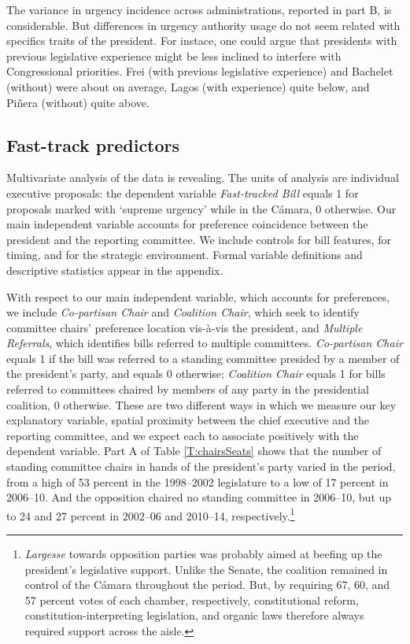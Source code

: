 \documentclass[letter,12pt]{article}
\begin{document}
The variance in urgency incidence across administrations, reported in part B, is considerable. But differences in urgency authority usage do not seem related with specifics traits of the president. For instace, one could argue that presidents with previous legislative experience might be less inclined to interfere with Congressional priorities. Frei (with previous legislative experience) and Bachelet (without) were about on average, Lagos (with experience) quite below, and Piñera (without) quite above. %

\subsection{Fast-track predictors}

Multivariate analysis of the data is revealing. The units of analysis are individual executive proposals: the dependent variable \emph{Fast-tracked Bill} equals 1 for proposals marked with `supreme urgency' while in the Cámara, 0 otherwise. Our main independent variable accounts for preference coincidence between the president and the reporting committee. We include controls for bill features, for timing, and for the strategic environment. Formal variable definitions and descriptive statistics appear in the appendix.

With respect to our main independent variable, which accounts for preferences, we include \emph{Co-partisan Chair} and \emph{Coalition Chair}, which seek to identify committee chairs' preference location vis-\`a-vis the president, and \emph{Multiple Referrals}, which identifies bills referred to multiple committees. \emph{Co-partisan Chair} equals 1 if the bill was referred to a standing committee presided by a member of the president's party, and equals 0 otherwise; \emph{Coalition Chair} equals 1 for bills referred to committees chaired by members of any party in the presidential coalition, 0 otherwise. These are two different ways in which we measure our key explanatory variable, spatial proximity between the chief executive and the reporting committee, and we expect each to associate positively with the dependent variable. Part A of Table \ref{T:chairsSeats} shows that the number of standing committee chairs in hands of the president's party varied in the period, from a high of 53 percent in the 1998--2002 legislature to a low of 17 percent in 2006--10. And the opposition chaired no standing committee in 2006--10, but up to 24 and 27 percent in 2002--06 and 2010--14, respectively.\footnote{\emph{Largesse} towards opposition parties was probably aimed at beefing up the president's legislative support. Unlike the Senate, the coalition remained in control of the Cámara throughout the period. But, by requiring 67, 60, and 57 percent votes of each chamber, respectively, constitutional reform, constitution-interpreting legislation, and organic laws therefore always required support across the aisle.}
\end{document}
